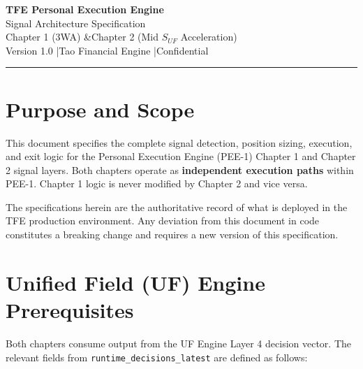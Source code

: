 \documentclass[11pt, a4paper]{article}
\begin{document}
\begin{center}
  {\LARGE \textbf{TFE Personal Execution Engine}}\\[6pt]
  {\large Signal Architecture Specification}\\[4pt]
  {\large Chapter 1 (3WA) \quad\&\quad Chapter 2 (Mid $S_{UF}$ Acceleration)}\\[8pt]
  {\color{tfe-gray}\small Version 1.0 \quad|\quad Tao Financial Engine \quad|\quad Confidential}
\end{center}

\vspace{1em}
\hrule
\vspace{1em}

\section{Purpose and Scope}

This document specifies the complete signal detection, position sizing, execution, and
exit logic for the Personal Execution Engine (PEE-1) Chapter 1 and Chapter 2 signal
layers. Both chapters operate as \textbf{independent execution paths} within PEE-1.
Chapter 1 logic is never modified by Chapter 2 and vice versa.

The specifications herein are the authoritative record of what is deployed in the
TFE production environment. Any deviation from this document in code constitutes
a breaking change and requires a new version of this specification.

\section{Unified Field (UF) Engine Prerequisites}

Both chapters consume output from the UF Engine Layer 4 decision vector. The relevant
fields from \texttt{runtime\_decisions\_latest} are defined as follows:
\end{document}
